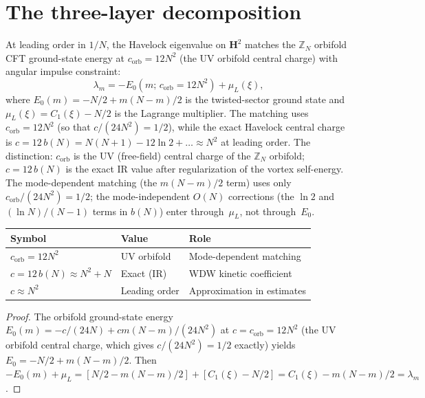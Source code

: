 
\section{The three-layer decomposition}
\label{sec:three-layer}

\begin{proposition}
\label{prop:orbifold-havelock}
At leading order in $1/N$, the Havelock eigenvalue on
$\mathbf{H}^2$ matches the $\mathbb{Z}_N$ orbifold CFT
ground-state energy at $c_{\mathrm{orb}} = 12N^2$
(the UV orbifold central charge)
with angular impulse constraint:
\begin{equation}\label{eq:orbifold-havelock}
  \lambda_m = -E_0(m;\,c_{\mathrm{orb}}{=}12N^2) + \mu_L(\xi),
\end{equation}
where $E_0(m) = -N/2 + m(N{-}m)/2$ is the twisted-sector
ground state and $\mu_L(\xi) = C_1(\xi) - N/2$ is the
Lagrange multiplier.
The matching uses $c_{\mathrm{orb}} = 12N^2$
(so that $c/(24N^2) = 1/2$), while the exact Havelock central charge
is $c = 12\,b(N) = N(N{+}1) - 12\ln 2 + \ldots \approx N^2$ at
leading order.
The distinction: $c_{\mathrm{orb}}$ is the UV (free-field) central
charge of the $\mathbb{Z}_N$ orbifold; $c = 12\,b(N)$ is the exact
IR value after regularization of the vortex self-energy.
The mode-dependent matching (the $m(N{-}m)/2$ term) uses only
$c_{\mathrm{orb}}/(24N^2) = 1/2$; the mode-independent
$O(N)$ corrections (the $\ln 2$ and $(\ln N)/(N{-}1)$ terms in $b(N)$)
enter through~$\mu_L$, not through~$E_0$.
\begin{center}
\small
\begin{tabular}{lll}
\toprule
Symbol & Value & Role \\
\midrule
$c_{\mathrm{orb}} = 12N^2$ & UV orbifold & Mode-dependent matching \\
$c = 12\,b(N) \approx N^2{+}N$ & Exact (IR) & WDW kinetic coefficient \\
$c \approx N^2$ & Leading order & Approximation in estimates \\
\bottomrule
\end{tabular}
\end{center}
\end{proposition}

\begin{proof}
The orbifold ground-state energy
$E_0(m) = -c/(24N) + cm(N{-}m)/(24N^2)$ at $c = c_{\mathrm{orb}} = 12N^2$
(the UV orbifold central charge, which gives $c/(24N^2) = 1/2$ exactly)
yields $E_0 = -N/2 + m(N{-}m)/2$.
Then $-E_0(m) + \mu_L = [N/2 - m(N{-}m)/2] + [C_1(\xi) - N/2]
= C_1(\xi) - m(N{-}m)/2 = \lambda_m$.
\end{proof}

